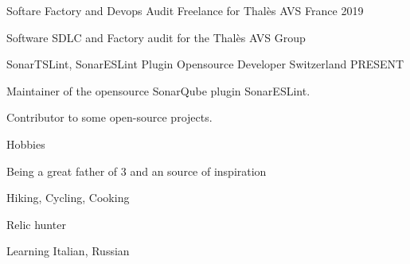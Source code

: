 \begin{cventries}
\cventry
{Softare Factory and Devops Audit} %
{Freelance for Thalès AVS} %
{France} %
{2019} %
{
  \begin{cvitems} %
  \item {Software SDLC and Factory audit for the Thalès AVS Group}
  \end{cvitems}
}

  \cventry
    {SonarTSLint, SonarESLint Plugin} %
    {Opensource Developer} %
    {Switzerland} %
    {PRESENT} %
    {
      \begin{cvitems} %
        \item {Maintainer of the opensource SonarQube plugin SonarESLint.}
		\item {Contributor to some open-source projects.}
      \end{cvitems}
    }

  \cventry
{Hobbies} %
{} %
{} %
{} %
{
	\begin{cvitems} %
		\item {Being a great father of 3 and an source of inspiration}
		\item {Hiking, Cycling, Cooking}
		\item {Relic hunter}
		\item {Learning Italian, Russian}
	\end{cvitems}
}

\end{cventries}
